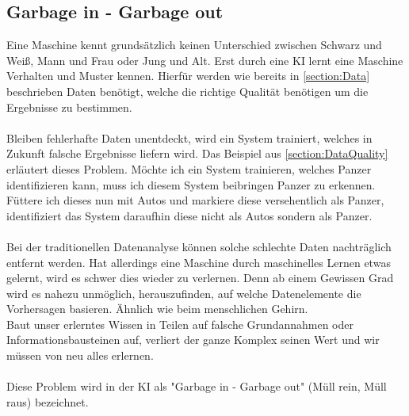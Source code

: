 \documentclass[12pt,oneside,a4paper,parskip]{scrbook}
\begin{document}
\subsection{Garbage in - Garbage out}
\label{section:DataGarbage}
Eine Maschine kennt grundsätzlich keinen Unterschied zwischen Schwarz und Weiß, Mann und Frau oder Jung und Alt. Erst durch eine KI lernt eine Maschine Verhalten und Muster kennen. Hierfür werden wie bereits in \ref{section:Data} beschrieben Daten benötigt, welche die richtige Qualität benötigen um die Ergebnisse zu bestimmen.
\\\\
Bleiben fehlerhafte Daten unentdeckt, wird ein System trainiert, welches in Zukunft falsche Ergebnisse liefern wird. Das Beispiel aus \ref{section:DataQuality} erläutert dieses Problem. Möchte ich ein System trainieren, welches Panzer identifizieren kann, muss ich diesem System beibringen Panzer zu erkennen. Füttere ich dieses nun mit Autos und markiere diese versehentlich als Panzer, identifiziert das System daraufhin diese nicht als Autos sondern als Panzer.
\\\\
Bei der traditionellen  Datenanalyse können solche schlechte Daten nachträglich entfernt werden. Hat allerdings eine Maschine durch maschinelles Lernen etwas gelernt, wird es schwer dies wieder zu verlernen. Denn ab einem Gewissen Grad wird es nahezu unmöglich, herauszufinden, auf welche Datenelemente die Vorhersagen basieren. Ähnlich wie beim menschlichen Gehirn.\\
Baut unser erlerntes Wissen in Teilen auf falsche Grundannahmen oder Informationsbausteinen auf, verliert der ganze Komplex seinen Wert und wir müssen von neu alles erlernen.
\\\\
Diese Problem wird in der KI als "Garbage in - Garbage out" (Müll rein, Müll raus) bezeichnet.
\end{document}
